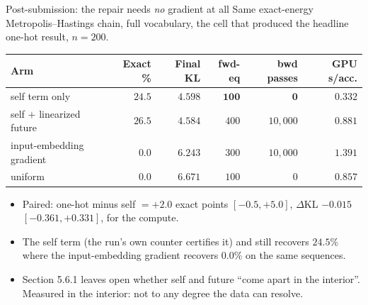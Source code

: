 \documentclass{beamer}
\begin{document}
\begin{frame}[noframenumbering]{Post-submission: the repair needs \emph{no} gradient at all}
  \small
  Same exact-energy Metropolis--Hastings chain, full vocabulary, the cell that produced the
  headline one-hot result, $n=200$.
  \begin{center}
  \scriptsize
  \setlength{\tabcolsep}{4pt}
  \begin{tabular}{lrrrrr}
    \toprule
    Arm & Exact \% & Final KL & fwd-eq & bwd passes & GPU s/acc. \\
    \midrule
    self term only              & $24.5$ & $4.598$ & $\bm{100}$ & $\bm{0}$ & $\bm{0.332}$ \\
    self $+$ linearized future  & $26.5$ & $4.584$ & $400$ & $10{,}000$ & $0.881$ \\
    input-embedding gradient    & $0.0$ & $6.243$ & $300$ & $10{,}000$ & $1.391$ \\
    uniform                     & $0.0$ & $6.671$ & $100$ & $0$ & $0.857$ \\
    \bottomrule
  \end{tabular}
  \end{center}
  \vspace{0.3em}
  \begin{itemize}\small
    \item Paired: one-hot minus self $=+2.0$ exact points $[-0.5,+5.0]$, $\Delta$KL $-0.015$
      $[-0.361,+0.331]$, for  the compute.
    \item The self term  (the run's own counter certifies
      it) and still recovers $24.5\%$ where the input-embedding gradient recovers $0.0\%$ on
      the same sequences.
    \item Section 5.6.1 leaves open whether self and future ``come apart in the interior''.
      Measured in the interior: not to any degree the data can resolve.
  \end{itemize}
\end{frame}
\end{document}
